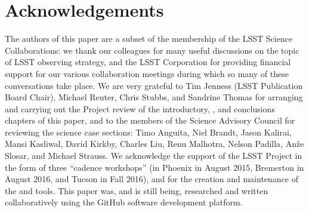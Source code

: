 
\section*{Acknowledgements}

The authors of this paper are a subset of the membership of the LSST
Science Collaborations: we thank our colleagues for many useful
discussions on the topic of LSST observing strategy, and the LSST
Corporation for providing financial support for our various
collaboration meetings during which so many of these conversations take
place. We are very grateful to Tim Jenness (LSST Publication Board
Chair), Michael Reuter, Chris Stubbs, and Sandrine Thomas for arranging
and carrying out the Project review of the introductory, \OpSim, and
conclusions chapters of this paper, and to the members of the Science
Advisory Council for reviewing the science case sections: Timo Anguita,
Niel Brandt, Jason Kalirai, Mansi Kasliwal, David Kirkby, Charles Liu,
Renu Malhotra, Nelson Padilla, An\^{z}e Slosar, and Michael Strauss. We
acknowledge the support of the LSST Project in the form of three
``cadence workshops'' (in Phoenix in August 2015, Bremerton in August
2016, and Tucson in Fall 2016), and for the creation and maintenance of
the \OpSim and \MAF tools. This paper was, and is still being,
researched and written collaboratively using the GitHub software
development platform.
